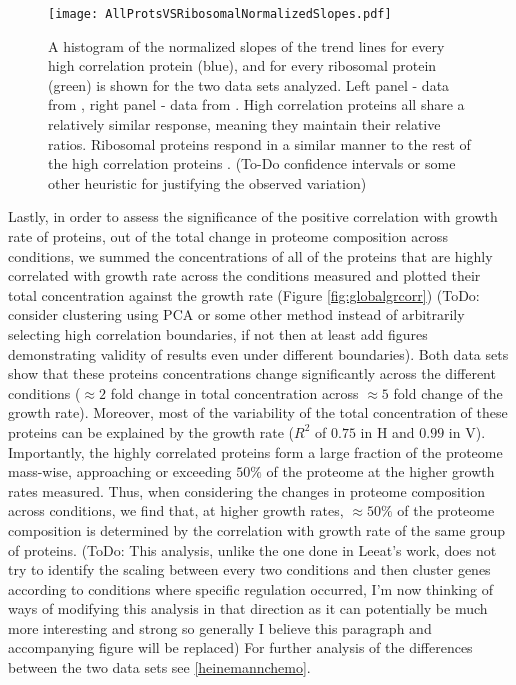 \documentclass[notitlepage]{article}
\begin{document}
\begin{figure}[h]
\centering
\texttt{[image: AllProtsVSRibosomalNormalizedSlopes.pdf]}
\caption{
    A histogram of the normalized slopes of the trend lines for every high correlation protein (blue), and for every ribosomal protein (green) is shown for the two data sets analyzed.
    Left panel - data from \parencite{Valgepea2013}, right panel - data from \parencite{Heinemann2014}.
    High correlation proteins all share a relatively similar response, meaning they maintain their relative ratios.
    Ribosomal proteins respond in a similar manner to the rest of the high correlation proteins .
    (To-Do confidence intervals or some other heuristic for justifying the observed variation)
}
\label{fig:globalfit}
\end{figure}

Lastly, in order to assess the significance of the positive correlation with growth rate of proteins, out of the total change in proteome composition across conditions, we summed the concentrations of all of the proteins that are highly correlated with growth rate across the conditions measured and plotted their total concentration against the growth rate (Figure \ref{fig:globalgrcorr})
(ToDo: consider clustering using PCA or some other method instead of arbitrarily selecting high correlation boundaries, if not then at least add figures demonstrating validity of results even under different boundaries).
Both data sets show that these proteins concentrations change significantly across the different conditions ($\approx 2$ fold change in total concentration across $\approx 5$ fold change of the growth rate).
Moreover, most of the variability of the total concentration of these proteins can be explained by the growth rate ($R^2$ of $0.75$ in H and $0.99$ in V). 
Importantly, the highly correlated proteins form a large fraction of the proteome mass-wise, approaching or exceeding $50\%$ of the proteome at the higher growth rates measured.
Thus, when considering the changes in proteome composition across conditions, we find that, at higher growth rates, $\approx 50\%$ of the proteome composition is determined by the correlation with growth rate of the same group of proteins.
(ToDo: This analysis, unlike the one done in Leeat's work, does not try to identify the scaling between every two conditions and then cluster genes according to conditions where specific regulation occurred, I'm now thinking of ways of modifying this analysis in that direction as it can potentially be much more interesting and strong so generally I believe this paragraph and accompanying figure will be replaced)
For further analysis of the differences between the two data sets see \ref{heinemannchemo}.
\end{document}
